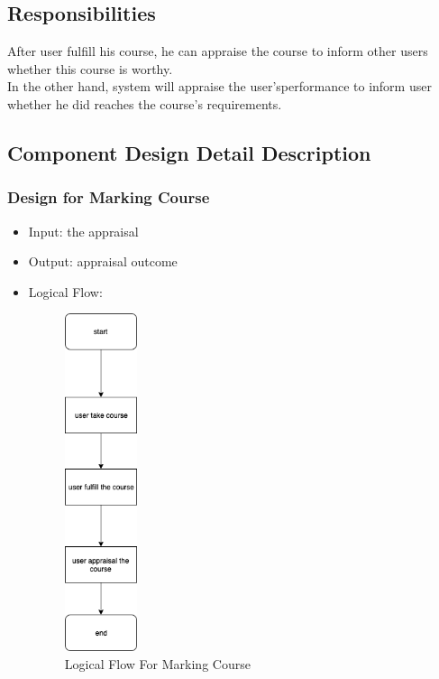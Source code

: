 \documentclass[16pt]{scrreprt}
\begin{document}
\subsection{Responsibilities}
After user fulfill his course, he can appraise the course to inform other users whether this course is worthy.\\
In the other hand, system will appraise the user’sperformance to inform user whether he did reaches the course's requirements.

\subsection{Component Design Detail Description}
\subsubsection{Design for Marking Course}
\begin{itemize}
    \item Input: the appraisal
    \item Output: appraisal outcome
    \item Logical Flow:
    \begin{figure}[H]
        \centering
        \includegraphics[width=0.2\textwidth]{diagrams/flow-appraisal.png}
        \caption{Logical Flow For Marking Course}
    \end{figure}
\end{itemize}
\end{document}
